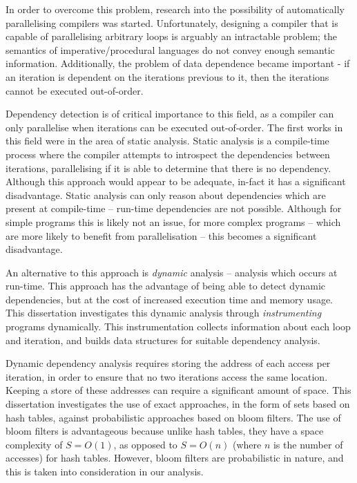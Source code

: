 In order to overcome this problem, research into the possibility of automatically parallelising compilers was started. Unfortunately, designing a compiler that is capable of parallelising arbitrary loops is arguably an intractable problem; the semantics of imperative/procedural languages do not convey enough semantic information. Additionally, the problem of data dependence became important - if an iteration is dependent on the iterations previous to it, then the iterations cannot be executed out-of-order.

Dependency detection is of critical importance to this field, as a compiler can only parallelise when iterations can be executed out-of-order. The first works in this field were in the area of static analysis. Static analysis is a compile-time process where the compiler attempts to introspect the dependencies between iterations, parallelising if it is able to determine that there is no dependency. Although this approach would appear to be adequate, in-fact it has a significant disadvantage. Static analysis can only reason about dependencies which are present at compile-time -- run-time dependencies are not possible. Although for simple programs this is likely not an issue, for more complex programs -- which are more likely to benefit from parallelisation -- this becomes a significant disadvantage.

An alternative to this approach is \textit{dynamic} analysis -- analysis which occurs at run-time. This approach has the advantage of being able to detect dynamic dependencies, but at the cost of increased execution time and memory usage. This dissertation investigates this dynamic analysis through \textit{instrumenting} programs dynamically. This instrumentation collects information about each loop and iteration, and builds data structures for suitable dependency analysis. 

Dynamic dependency analysis requires storing the address of each access per iteration, in order to ensure that no two iterations access the same location. Keeping a store of these addresses can require a significant amount of space. This dissertation investigates the use of exact approaches, in the form of sets based on hash tables, against probabilistic approaches based on bloom filters. The use of bloom filters is advantageous because unlike hash tables, they have a space complexity of $S=O(1)$, as opposed to $S=O(n)$ (where $n$ is the number of accesses) for hash tables. However, bloom filters are probabilistic in nature, and this is taken into consideration in our analysis.

